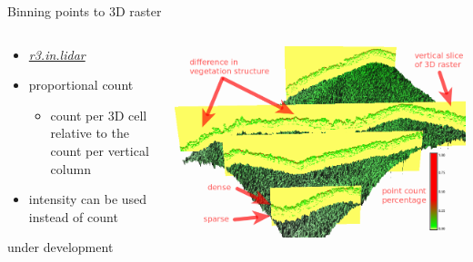 \documentclass[xcolor={dvipsnames,usenames},beamer,aspectratio=169]{beamer}
\newcommand{\gmodule}[1]{\href{http://grass.osgeo.org/grass71/manuals/#1.html}{\emph{#1}}}
\begin{document}
\begin{frame}{Binning points to 3D raster}

\begin{columns}
\begin{column}{0.28\textwidth}

\begin{itemize}
  \item \gmodule{r3.in.lidar}
  \item proportional count
  \begin{itemize}
    \item count per 3D cell relative to the count per vertical column
  \end{itemize}
  \item intensity can be used instead of count
\end{itemize}

\bigskip
\footnotesize
under development

\end{column}
\begin{column}{0.7\textwidth}

\begin{center}
  \includegraphics[width=\textwidth]{grass/red_green_3d_labels}
\end{center}

\end{column}
\end{columns}


\end{frame}
\end{document}
